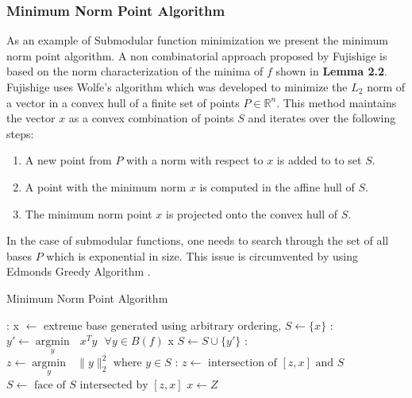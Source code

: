 \subsubsection{Minimum Norm Point Algorithm}
As an example of Submodular function minimization we present the minimum norm point algorithm. A non combinatorial approach proposed by Fujishige \cite{Fujishige} is based on the norm characterization of the minima of $f$ shown in {\bf Lemma 2.2}. Fujishige uses Wolfe's algorithm \cite{Wolfe} which was developed to minimize the $L_2$ norm of a vector in a convex hull of a finite set of points $P \in \mathds{R}^n$. This method maintains the vector $x$ as a convex combination of points $S$ and iterates over the following steps:
\begin{enumerate}
\item A new point from $P$ with a norm with respect to $x$ is added to to set $S$.
\item A point with the minimum norm $x$ is computed in the affine hull of $S$.
\item The minimum norm point $x$ is projected onto the convex hull of $S$. 
\end{enumerate}

In the case of submodular functions, one needs to search through the set of all bases $P$ which is exponential in size. This issue is circumvented by using Edmonds Greedy Algorithm \cite{Edmond}.

\begin{algorithm}[htb]
\caption{Minimum Norm Point Algorithm}
\label{alg:min_norm_point}
\begin{algorithmic}[1]
\footnotesize
{}: x $\leftarrow$ extreme base generated using arbitrary ordering, $S \leftarrow \{x\}$
\Loop
  : $y' \leftarrow  \underset{y}{\operatorname{argmin }}\text{ } x^Ty \text{ } \forall y\in B(f)$
 x
\Else
\State $S \leftarrow S \cup \{y'\}$
\EndIf
{}: $z \leftarrow  \underset{y}{\operatorname{argmin }}\text{ } {\|y\|_2^2 \text{ where } y\in S}$
: 
               \State $z \leftarrow \text{ intersection of } [z,x] \text{ and } S$
		\State $S \leftarrow \text{ face of $S$ intersected by } [z,x]$
\EndWhile
\State $x\leftarrow Z$
\EndLoop
\end{algorithmic}
\end{algorithm}